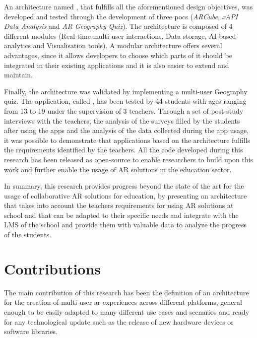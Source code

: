 An architecture named \arch{}, that fulfills all the aforementioned design objectives, was developed and tested through the development of three \glspl{poc} (\textit{ARCube}, \textit{xAPI Data Analysis} and \textit{AR Geography Quiz}). The architecture is composed of 4 different modules (Real-time multi-user interactions, Data storage, AI-based analytics and Visualisation tools). A modular architecture offers several advantages, since it allows developers to choose which parts of it should be integrated in their existing applications and it is also easier to extend and maintain.

Finally, the architecture was validated by implementing a multi-user Geography quiz. The application, called \appname{}, has been tested by 44 students with ages ranging from 13 to 19 under the supervision of 3 teachers. Through a set of post-study interviews with the teachers, the analysis of the surveys filled by the students after using the apps and the analysis of the data collected during the app usage, it was possible to demonstrate that applications based on the \arch{} architecture fulfills the requirements identified by the teachers. All the code developed during this research has been released as open-source to enable researchers to build upon this work and further enable the usage of AR solutions in the education sector.

In summary, this research provides progress beyond the state of the art for the usage of collaborative AR solutions for education, by presenting an architecture that takes into account the teachers requirements for using AR solutions at school and that can be adapted to their specific needs and integrate with the LMS of the school and provide them with valuable data to analyze the progress of the students.

\section{Contributions}\label{sec:contribs}
The main contribution of this research has been the definition of an architecture for the creation of multi-user \gls{ar} experiences across different platforms, general enough to be easily adapted to many different use cases and scenarios and ready for any technological update such as the release of new hardware devices or software libraries. 

